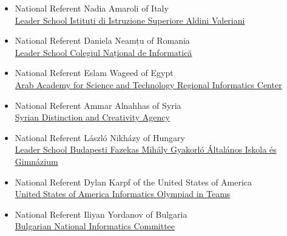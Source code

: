 \documentclass{article}
\begin{document}
\begin{itemize}

\item National Referent Nadia Amaroli of Italy \\
\href{https://avbo.edu.it/}{Leader School Istituti di Istruzione Superiore Aldini Valeriani}

\item National Referent Daniela Neamțu of Romania \\
\href{http://cni.nt.edu.ro/new/}{Leader School Colegiul Național de Informatică}

\item National Referent Eslam Wageed of Egypt \\
\href{https://aast.edu/en/}{Arab Academy for Science and Technology Regional Informatics Center}

\item National Referent Ammar Alnahhas of Syria \\
\href{https://dca-net.org/}{Syrian Distinction and Creativity Agency}

\item National Referent László Nikházy of Hungary \\
\href{https://fazekas.hu/}{Leader School Budapesti Fazekas Mihály Gyakorló Általános Iskola és Gimnázium}

\item National Referent Dylan Karpf of the United States of America \\
\href{https://www.usiot.net/}{United States of America Informatics Olympiad in Teams}

\item National Referent Iliyan Yordanov of Bulgaria \\
\href{https://infos.infosbg.com/}{Bulgarian National Informatics Committee}

\end{itemize}
\end{document}
